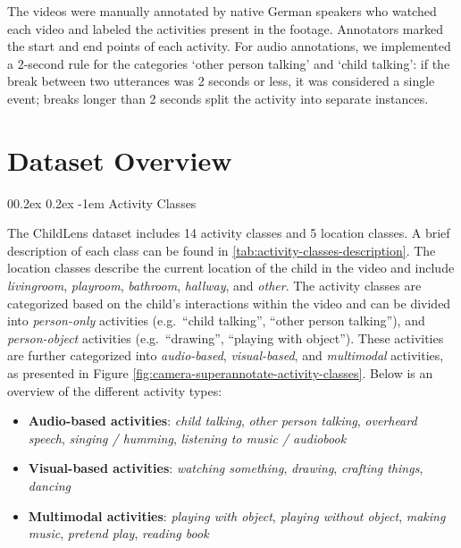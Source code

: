 \documentclass[
  man,floatsintext]{apa6}
\makeatletter
\providecommand{\tightlist}{%
  \setlength{\itemsep}{0pt}\setlength{\parskip}{0pt}}
\let\oldparagraph\paragraph
\renewcommand{\paragraph}{
    \@ifstar
      \xxxParagraphStar
      \xxxParagraphNoStar
  }
\newcommand{\xxxParagraphStar}[1]{\oldparagraph*{#1}\mbox{}}
\newcommand{\xxxParagraphNoStar}[1]{\oldparagraph{#1}\mbox{}}
\renewcommand{\paragraph}{\@startsection{paragraph}{4}{\parindent}%
  {0\baselineskip \@plus 0.2ex \@minus 0.2ex}%
  {-1em}%
  {\normalfont\normalsize\bfseries\itshape\typesectitle}}
\makeatother
\begin{document}
The videos were manually annotated by native German speakers who watched each video and labeled the activities present in the footage. Annotators marked the start and end points of each activity. For audio annotations, we implemented a 2-second rule for the categories `other person talking' and `child talking': if the break between two utterances was 2 seconds or less, it was considered a single event; breaks longer than 2 seconds split the activity into separate instances.

\section{Dataset Overview}\label{dataset-overview}

\paragraph{Activity Classes}\label{activity-classes}

The ChildLens dataset includes 14 activity classes and 5 location classes. A brief description of each class can be found in \ref{tab:activity-classes-description}. The location classes describe the current location of the child in the video and include \emph{livingroom}, \emph{playroom}, \emph{bathroom}, \emph{hallway}, and \emph{other}.
The activity classes are categorized based on the child's interactions within the video and can be divided into \emph{person-only} activities (e.g.~``child talking'', ``other person talking''), and \emph{person-object} activities (e.g.~``drawing'', ``playing with object''). These activities are further categorized into \emph{audio-based}, \emph{visual-based}, and \emph{multimodal} activities, as presented in Figure \ref{fig:camera-superannotate-activity-classes}. Below is an overview of the different activity types:

\begin{itemize}
\tightlist
\item
  \textbf{Audio-based activities}: \emph{child talking}, \emph{other person talking}, \emph{overheard speech}, \emph{singing / humming}, \emph{listening to music / audiobook}
\item
  \textbf{Visual-based activities}: \emph{watching something}, \emph{drawing}, \emph{crafting things}, \emph{dancing}
\item
  \textbf{Multimodal activities}: \emph{playing with object}, \emph{playing without object}, \emph{making music}, \emph{pretend play}, \emph{reading book}
\end{itemize}
\end{document}
